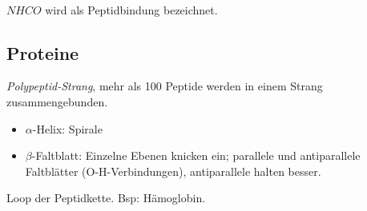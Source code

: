 \chemsign{+}

\chemrel{->}
{\vspace{4em}\chemsign{+}}
\\

$NHCO$ wird als Peptidbindung bezeichnet.

\subsection{Proteine}

\begin{definition}[Primärstruktur]
	\textit{Polypeptid-Strang}, mehr als 100 Peptide werden in einem Strang zusammengebunden.
\end{definition}

\begin{definition}[Sekundärstruktur]
	\begin{itemize}
		\item $\alpha$-Helix: Spirale
		\item $\beta$-Faltblatt: Einzelne Ebenen knicken ein; parallele und antiparallele Faltblätter (O-H-Verbindungen), antiparallele halten besser.
	\end{itemize}
\end{definition}

\begin{definition}[Tertiärstruktur]
	Loop der Peptidkette. Bsp: Hämoglobin.
\end{definition}








